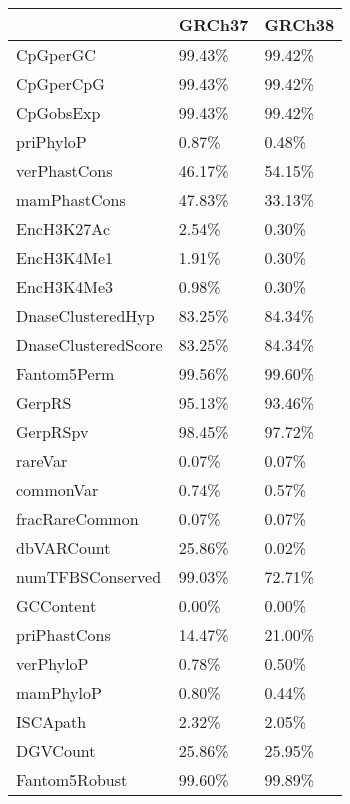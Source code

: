 \begin{tabular}{lll}
\toprule
{} &  GRCh37 &  GRCh38 \\
\midrule
CpGperGC            &  99.43\% &  99.42\% \\
CpGperCpG           &  99.43\% &  99.42\% \\
CpGobsExp           &  99.43\% &  99.42\% \\
priPhyloP           &   0.87\% &   0.48\% \\
verPhastCons        &  46.17\% &  54.15\% \\
mamPhastCons        &  47.83\% &  33.13\% \\
EncH3K27Ac          &   2.54\% &   0.30\% \\
EncH3K4Me1          &   1.91\% &   0.30\% \\
EncH3K4Me3          &   0.98\% &   0.30\% \\
DnaseClusteredHyp   &  83.25\% &  84.34\% \\
DnaseClusteredScore &  83.25\% &  84.34\% \\
Fantom5Perm         &  99.56\% &  99.60\% \\
GerpRS              &  95.13\% &  93.46\% \\
GerpRSpv            &  98.45\% &  97.72\% \\
rareVar             &   0.07\% &   0.07\% \\
commonVar           &   0.74\% &   0.57\% \\
fracRareCommon      &   0.07\% &   0.07\% \\
dbVARCount          &  25.86\% &   0.02\% \\
numTFBSConserved    &  99.03\% &  72.71\% \\
GCContent           &   0.00\% &   0.00\% \\
priPhastCons        &  14.47\% &  21.00\% \\
verPhyloP           &   0.78\% &   0.50\% \\
mamPhyloP           &   0.80\% &   0.44\% \\
ISCApath            &   2.32\% &   2.05\% \\
DGVCount            &  25.86\% &  25.95\% \\
Fantom5Robust       &  99.60\% &  99.89\% \\
\bottomrule
\end{tabular}
